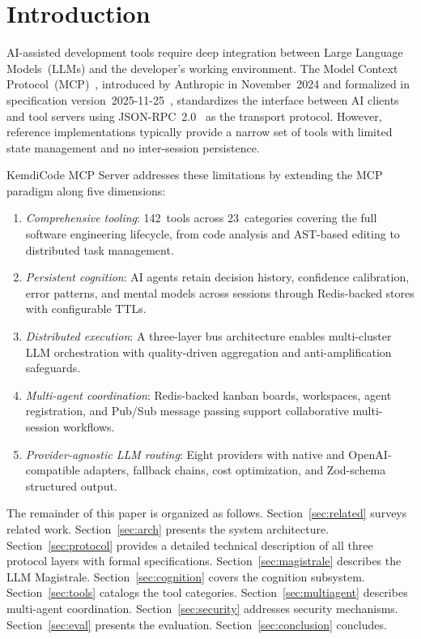 \documentclass[journal,10pt]{IEEEtran}
\begin{document}
\section{Introduction}
\label{sec:intro}

 AI-assisted development tools require deep integration between Large Language Models~(LLMs) and the developer's working environment. The Model Context Protocol~(MCP)~\cite{mcp2024}, introduced by Anthropic in November~2024 and formalized in specification version~2025-11-25~\cite{mcpspec2025}, standardizes the interface between AI clients and tool servers using JSON-RPC~2.0~\cite{jsonrpc2} as the transport protocol. However, reference implementations typically provide a narrow set of tools with limited state management and no inter-session persistence.

KemdiCode MCP Server addresses these limitations by extending the MCP paradigm along five dimensions:

\begin{enumerate}[nosep,label=(\roman*)]
  \item \emph{Comprehensive tooling}: 142~tools across 23~categories covering the full software engineering lifecycle, from code analysis and AST-based editing to distributed task management.
  \item \emph{Persistent cognition}: AI agents retain decision history, confidence calibration, error patterns, and mental models across sessions through Redis-backed stores with configurable TTLs.
  \item \emph{Distributed execution}: A three-layer bus architecture enables multi-cluster LLM orchestration with quality-driven aggregation and anti-amplification safeguards.
  \item \emph{Multi-agent coordination}: Redis-backed kanban boards, workspaces, agent registration, and Pub/Sub message passing support collaborative multi-session workflows.
  \item \emph{Provider-agnostic LLM routing}: Eight providers with native and OpenAI-compatible adapters, fallback chains, cost optimization, and Zod-schema structured output.
\end{enumerate}

The remainder of this paper is organized as follows. Section~\ref{sec:related} surveys related work. Section~\ref{sec:arch} presents the system architecture. Section~\ref{sec:protocol} provides a detailed technical description of all three protocol layers with formal specifications. Section~\ref{sec:magistrale} describes the LLM Magistrale. Section~\ref{sec:cognition} covers the cognition subsystem. Section~\ref{sec:tools} catalogs the tool categories. Section~\ref{sec:multiagent} describes multi-agent coordination. Section~\ref{sec:security} addresses security mechanisms. Section~\ref{sec:eval} presents the evaluation. Section~\ref{sec:conclusion} concludes.
\end{document}
